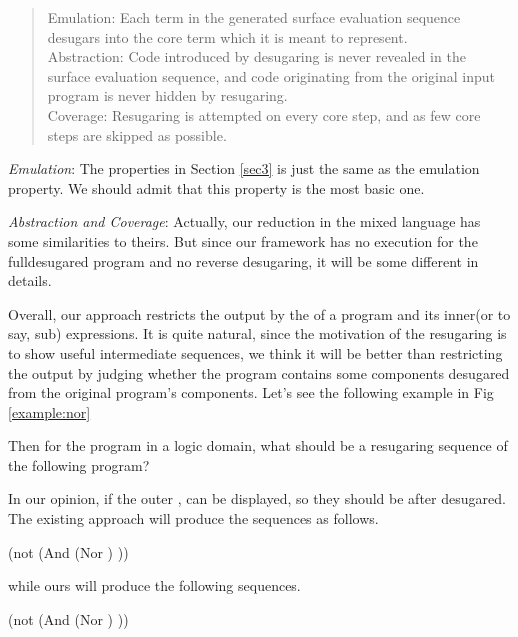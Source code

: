 \begin{quote}
Emulation: 
Each term in the generated surface evaluation sequence desugars into the core term which it is meant to represent.\\
Abstraction: 
Code introduced by desugaring is never revealed in the surface evaluation sequence, and code originating from the original input program is never hidden by resugaring.\\
Coverage: Resugaring is attempted on every core step, and as few core steps are skipped as possible.\\
\end{quote}

\emph{Emulation}: The properties in Section \ref{sec3} is just the same as the emulation property. We should admit that this property is the most basic one.

\emph{Abstraction and Coverage}: Actually, our reduction in the mixed language has some similarities to theirs. But since our framework has no execution for the fulldesugared program and no reverse desugaring, it will be some different in details.

Overall, our approach restricts the output by the  of a program and its inner(or to say, sub) expressions. It is quite natural, since the motivation of the resugaring is to show useful intermediate sequences, we think it will be better than restricting the output by judging whether the program contains some components desugared from the original program's components. Let's see the following example in Fig \ref{example:nor}

Then for the program in a logic domain, what should be a resugaring sequence of the following program?\\ 

In our opinion, if the outer ,  can be displayed, so they should be after desugared.
The existing approach will produce the sequences as follows.
\begin{Codes}
    (not (And (Nor \false \true) \true))
\OneStep{ \true}
\end{Codes}
while ours will produce the following sequences.

\begin{Codes}
    (not (And (Nor \false \true) \true))
\OneStep{ \true}
\end{Codes}

